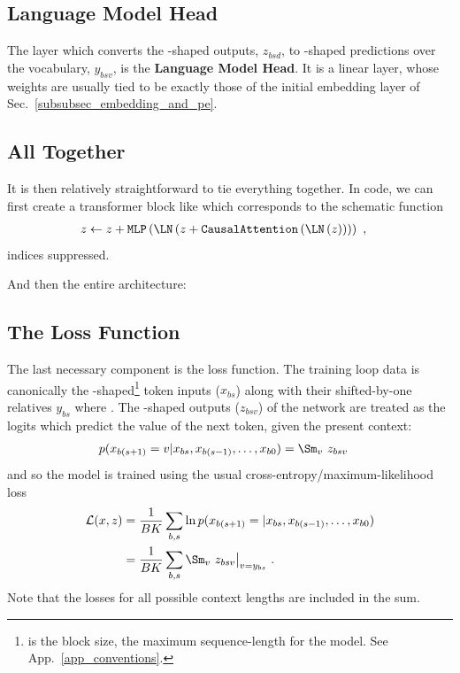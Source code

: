 \documentclass[11pt]{article}
\begin{document}
\subsection{Language Model Head \label{subsubsec_language_model_head} }


The layer which converts the -shaped outputs, $ z _{ bsd } $, to -shaped
predictions over the vocabulary, $  y _{ bsv } $, is the \textbf{Language Model Head}. It
is a linear layer, whose weights are usually tied to be exactly those of the initial embedding
layer of Sec.~\ref{subsubsec_embedding_and_pe}.


\subsection{All Together}
It is then relatively straightforward to tie everything together.  In code, we can first create a
transformer block like
which corresponds to the schematic function
\begin{align}
  z &\leftarrow  z + \texttt{MLP}\left ( \LN \left ( z + \texttt{CausalAttention}\left ( \LN \left (
  z\right ) \right )  \right ) \right )\ ,
\end{align}
indices suppressed.

And then the entire architecture: 


\subsection{The Loss Function}

The last necessary component is the loss function. The training loop data is canonically the
-shaped\footnote{ is the block size, the maximum sequence-length for
the model. See App.~\ref{app_conventions}.}  token inputs ($ x _{ bs } $) along with their shifted-by-one relatives $ y
_{ bs }$ where .  The -shaped
outputs ($ z _{ bsv } $)  of the  network are treated as the logits which
predict the value of the next token, given the present context:
\begin{align}
    p(x _{ b (s+1) }=v| x _{ b s }, x _{ b (s-1) }, \ldots, x _{ b 0 }) &= \Sm _{ v }\ z _{ bsv
    }\label{eq_transformer_conditional_prob}
\end{align}
and so the model is trained using the usual cross-entropy/maximum-likelihood loss
\begin{align}
  \Lcal(x, z) &= \frac{ 1 }{ BK }\sum _{ b,s }\ln p(x _{ b (s+1) }=| x _{ b s }, x _{ b (s-1) },
  \ldots, x _{ b 0 })\nn
  &= \frac{ 1 }{ BK }\sum _{ b,s }\Sm _{ v }\ z _{ bsv}\big| _{ v=y _{ bs } } \ .
\end{align}
Note that the losses for all possible context lengths are included in the sum.
\end{document}
